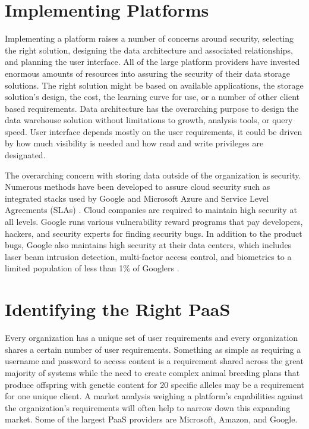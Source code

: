 \documentclass[sigconf]{acmart}
\begin{document}
\section{Implementing Platforms}
Implementing a platform raises a number of concerns around security, selecting the right solution, designing the data architecture and associated relationships, and planning the user interface. All of the large platform providers have invested enormous amounts of resources into assuring the security of their data storage solutions. The right solution might be based on available applications, the storage solution's design, the cost, the learning curve for use, or a number of other client based requirements. Data architecture has the overarching purpose to design the data warehouse solution without limitations to growth, analysis tools, or query speed. User interface depends mostly on the user requirements, it could be driven by how much visibility is needed and how read and write privileges are designated. 

The overarching concern with storing data outside of the organization is security. Numerous methods have been developed to assure cloud security such as integrated stacks used by Google and Microsoft Azure and Service Level Agreements (SLAs) \cite{Casola}. Cloud companies are required to maintain high security at all levels. Google runs various vulnerability reward programs that pay developers, hackers, and security experts for finding security bugs. In addition to the product bugs, Google also maintains high security at their data centers, which includes laser beam intrusion detection, multi-factor access control, and biometrics to a limited population of less than 1\% of Googlers \cite{www-gcp-security}. 

\section{Identifying the Right PaaS}
Every organization has a unique set of user requirements and every organization shares a certain number of user requirements. Something as simple as requiring a username and password to access content is a requirement shared across the great majority of systems while the need to create complex animal breeding plans that produce offspring with genetic content for 20 specific alleles may be a requirement for one unique client. A market analysis weighing a platform's capabilities against the organization's requirements will often help to narrow down this expanding market. Some of the largest PaaS providers are Microsoft, Amazon, and Google. 
\end{document}
